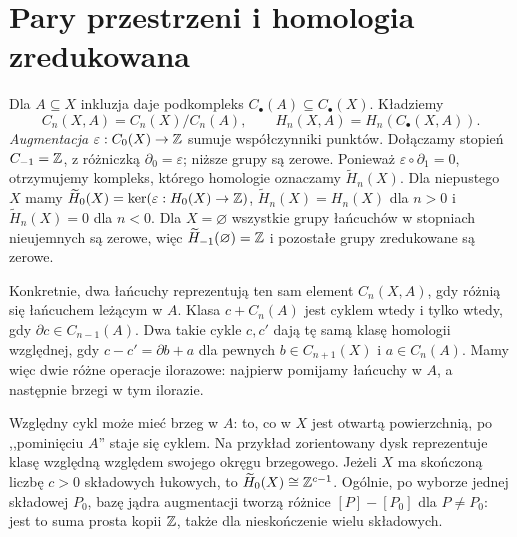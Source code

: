 \section{Pary przestrzeni i homologia zredukowana}
\label{sec:homologia-wzgledna}

\begin{definicja}
\label{def:homologia-wzgledna}
Dla $A\subseteq X$ inkluzja daje
podkompleks $C_\bullet(A)\subseteq C_\bullet(X)$.
Kładziemy
\[
 C_n(X,A)=C_n(X)/C_n(A),\qquad
 H_n(X,A)=H_n(C_\bullet(X,A)).
\]
\emph{Augmentacja} $\varepsilon:C_0(X)\to\mathbb{Z}$ sumuje
współczynniki punktów. Dołączamy stopień $C_{-1}=\mathbb{Z}$,
z różniczką $\partial_0=\varepsilon$; niższe grupy są zerowe.
Ponieważ $\varepsilon\circ\partial_1=0$, otrzymujemy kompleks,
którego homologie oznaczamy $\widetilde H_n(X)$.
Dla niepustego $X$ mamy
$\widetilde H_0(X)=\ker(\varepsilon:H_0(X)\to\mathbb{Z})$,
$\widetilde H_n(X)=H_n(X)$ dla $n>0$ i
$\widetilde H_n(X)=0$ dla $n<0$.
Dla $X=\varnothing$ wszystkie grupy łańcuchów w stopniach
nieujemnych są zerowe, więc $\widetilde H_{-1}(\varnothing)=\mathbb{Z}$
i pozostałe grupy zredukowane są zerowe.
\end{definicja}

Konkretnie, dwa łańcuchy reprezentują ten sam element $C_n(X,A)$,
gdy różnią się łańcuchem leżącym w $A$. Klasa $c+C_n(A)$ jest
cyklem wtedy i tylko wtedy, gdy $\partial c\in C_{n-1}(A)$.
Dwa takie cykle $c,c'$ dają tę samą klasę homologii względnej,
gdy $c-c'=\partial b+a$ dla pewnych $b\in C_{n+1}(X)$
i $a\in C_n(A)$. Mamy więc dwie różne operacje ilorazowe:
najpierw pomijamy łańcuchy w $A$, a następnie brzegi w tym ilorazie.

Względny cykl może mieć brzeg w $A$:
to, co w $X$ jest otwartą powierzchnią,
po ,,pominięciu $A$'' staje się cyklem.
Na przykład zorientowany dysk reprezentuje klasę względną
względem swojego okręgu brzegowego.
Jeżeli $X$ ma skończoną liczbę $c>0$ składowych łukowych,
to $\widetilde H_0(X)\cong\mathbb{Z}^{c-1}$.
Ogólnie, po wyborze jednej składowej $P_0$, bazę jądra
augmentacji tworzą różnice $[P]-[P_0]$ dla $P\ne P_0$:
jest to suma prosta kopii $\mathbb{Z}$, także dla nieskończenie wielu składowych.

